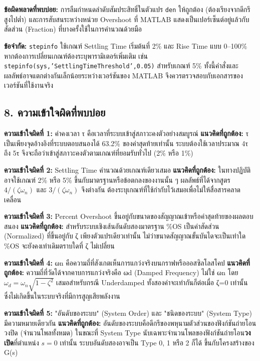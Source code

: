 \textbf{ข้อผิดพลาดที่พบบ่อย:} การลืมกำหนดลำดับสัมประสิทธิ์ในตัวแปร \texttt{den} ให้ถูกต้อง (ต้องเรียงจากดีกรีสูงไปต่ำ) และการสับสนระหว่างหน่วย Overshoot ที่ MATLAB แสดงเป็นเปอร์เซ็นต์อยู่แล้วกับสัดส่วน (Fraction) ที่บางครั้งใช้ในการคำนวณด้วยมือ

\textbf{ข้อจำกัด:} \texttt{stepinfo} ใช้เกณฑ์ Settling Time เริ่มต้นที่ 2\% และ Rise Time แบบ 0–100\% หากต้องการเปลี่ยนเกณฑ์ต้องระบุพารามิเตอร์เพิ่มเติม เช่น \texttt{stepinfo(sys,'SettlingTimeThreshold',0.05)} สำหรับเกณฑ์ 5\% ทั้งนี้คำสั่งและผลลัพธ์อาจแตกต่างกันเล็กน้อยระหว่างเวอร์ชันของ MATLAB จึงควรตรวจสอบกับเอกสารของเวอร์ชันที่ใช้งานจริง



\subsection{8. ความเข้าใจผิดที่พบบ่อย}

\textbf{ความเข้าใจผิดที่ 1:} ค่าคงเวลา τ คือเวลาที่ระบบเข้าสู่สภาวะคงตัวอย่างสมบูรณ์
\textbf{แนวคิดที่ถูกต้อง:} τ เป็นเพียงจุดอ้างอิงที่ระบบตอบสนองได้ 63.2\% ของค่าสุดท้ายเท่านั้น ระบบต้องใช้เวลาประมาณ 4τ ถึง 5τ จึงจะถือว่าเข้าสู่สภาวะคงตัวตามเกณฑ์ที่ยอมรับทั่วไป (2\% หรือ 1\%)

\textbf{ความเข้าใจผิดที่ 2:} Settling Time คำนวณด้วยเกณฑ์เดียวเสมอ
\textbf{แนวคิดที่ถูกต้อง:} ในทางปฏิบัติอาจใช้เกณฑ์ 2\% หรือ 5\% ขึ้นกับมาตรฐานหรือข้อตกลงของงานนั้น ๆ ผลลัพธ์ที่ได้จากสูตร $4/(\zeta\omega_n)$ และ $3/(\zeta\omega_n)$ จึงต่างกัน ต้องระบุเกณฑ์ที่ใช้กำกับไว้เสมอเพื่อไม่ให้สื่อสารคลาดเคลื่อน

\textbf{ความเข้าใจผิดที่ 3:} Percent Overshoot ขึ้นอยู่กับขนาดของสัญญาณเข้าหรือค่าสุดท้ายของผลตอบสนอง
\textbf{แนวคิดที่ถูกต้อง:} สำหรับระบบเชิงเส้นอันดับสองมาตรฐาน \%OS เป็นค่าสัดส่วน (Normalized) ที่ขึ้นอยู่กับ ζ เพียงตัวแปรเดียวเท่านั้น ไม่ว่าขนาดสัญญาณขั้นบันไดจะเป็นเท่าใด \%OS จะยังคงเท่าเดิมตราบใดที่ ζ ไม่เปลี่ยน

\textbf{ความเข้าใจผิดที่ 4:} ωn คือความถี่ที่สังเกตเห็นการแกว่งจริงบนกราฟหรือออสซิลโลสโคป
\textbf{แนวคิดที่ถูกต้อง:} ความถี่ที่วัดได้จากคาบการแกว่งจริงคือ ωd (Damped Frequency) ไม่ใช่ ωn โดย $\omega_d=\omega_n\sqrt{1-\zeta^2}$ เสมอสำหรับกรณี Underdamped ทั้งสองค่าจะเท่ากันก็ต่อเมื่อ ζ=0 เท่านั้น ซึ่งไม่เกิดขึ้นในระบบจริงที่มีการสูญเสียพลังงาน

\textbf{ความเข้าใจผิดที่ 5:} "อันดับของระบบ" (System Order) และ "ชนิดของระบบ" (System Type) มีความหมายเดียวกัน
\textbf{แนวคิดที่ถูกต้อง:} อันดับของระบบคือดีกรีของพหุนามตัวส่วนของฟังก์ชันถ่ายโอนวงปิด (จำนวนโพลทั้งหมด) ในขณะที่ System Type นับเฉพาะจำนวนโพลของฟังก์ชันถ่ายโอน\textbf{วงเปิด}ที่ตำแหน่ง $s=0$ เท่านั้น ระบบอันดับสองอาจเป็น Type 0, 1 หรือ 2 ก็ได้ ขึ้นกับโครงสร้างของ G(s)

